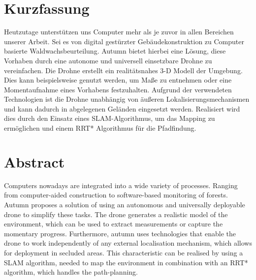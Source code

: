 \chapter{Kurzfassung}

\vspace{10mm}

Heutzutage unterstützen uns Computer mehr als je zuvor in allen Bereichen unserer Arbeit. Sei es von digital gestürzter Gebäudekonstruktion zu Computer basierte Waldwachsbeurteilung. Autumn bietet hierbei eine Lösung, diese Vorhaben durch eine autonome und universell einsetzbare Drohne zu vereinfachen. Die Drohne erstellt ein realitätsnahes 3-D Modell der Umgebung. Dies kann beispielsweise genutzt werden, um Maße zu entnehmen oder eine Momentaufnahme eines Vorhabens festzuhalten. Aufgrund der verwendeten Technologien ist die Drohne unabhängig von äußeren Lokalisierungsmechanismen und kann dadurch in abgelegenen Geländen eingesetzt werden. Realisiert wird dies durch den Einsatz eines SLAM-Algorithmus, um das Mapping zu ermöglichen und einem RRT* Algorithmus für die Pfadfindung.

\chapter{Abstract}

\vspace{10mm}

Computers nowadays are integrated into a wide variety of processes. Ranging from computer-aided construction to software-based monitoring of forests. Autumn proposes a solution of using an autonomous and universally deployable drone to simplify these tasks. The drone generates a realistic model of the environment, which can be used to extract measurements or capture the momentary progress. Furthermore, autumn uses technologies that enable the drone to work independently of any external localisation mechanism, which allows for deployment in secluded areas. This characteristic can be realised by using a SLAM algorithm, needed to map the environment in combination with an RRT* algorithm, which handles the path-planning.